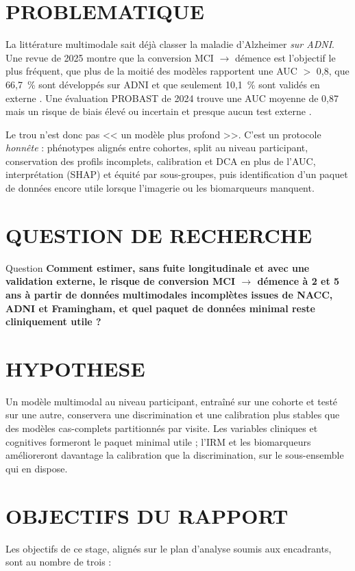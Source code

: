 \section*{PROBLEMATIQUE}
La littérature multimodale sait déjà classer la maladie d'Alzheimer \emph{sur ADNI}. Une revue de 2025 montre que la conversion MCI $\rightarrow$ démence est l'objectif le plus fréquent, que plus de la moitié des modèles rapportent une AUC $>$ 0,8, que 66,7~\% sont développés sur ADNI et que seulement 10,1~\% sont validés en externe \cite{xia2025scoping}. Une évaluation \ac{PROBAST} de 2024 trouve une AUC moyenne de 0,87 mais un risque de biais élevé ou incertain et presque aucun test externe \cite{chen2024probast}.

Le trou n'est donc pas << un modèle plus profond >>. C'est un protocole \emph{honnête} : phénotypes alignés entre cohortes, split au niveau participant, conservation des profils incomplets, calibration et \ac{DCA} en plus de l'AUC, interprétation (\ac{SHAP}) et équité par sous-groupes, puis identification d'un paquet de données encore utile lorsque l'imagerie ou les biomarqueurs manquent.

\section*{QUESTION DE RECHERCHE}
\begin{bidentidad}{Question}
    \centering
    \textbf{Comment estimer, sans fuite longitudinale et avec une validation externe, le risque de conversion MCI $\rightarrow$ démence à 2 et 5 ans à partir de données multimodales incomplètes issues de NACC, ADNI et Framingham, et quel paquet de données minimal reste cliniquement utile ?}
\end{bidentidad}

\section*{HYPOTHESE}
Un modèle multimodal au niveau participant, entraîné sur une cohorte et testé sur une autre, conservera une discrimination et une calibration plus stables que des modèles cas-complets partitionnés par visite. Les variables cliniques et cognitives formeront le paquet minimal utile ; l'IRM et les biomarqueurs amélioreront davantage la calibration que la discrimination, sur le sous-ensemble qui en dispose.

\section*{OBJECTIFS DU RAPPORT}
Les objectifs de ce stage, alignés sur le plan d'analyse soumis aux encadrants, sont au nombre de trois :


